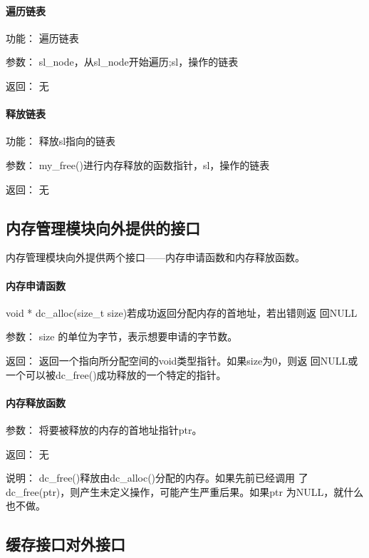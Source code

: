 \paragraph{遍历链表}
	\begin{compactdesc}
	\item[功能：]遍历链表
	\item[参数：]sl\_node，从sl\_node开始遍历;sl，操作的链表
	\item[返回：]无
	\end{compactdesc}
\paragraph{ 释放链表}
	\begin{compactdesc}
	\item[功能：]释放sl指向的链表
	\item[参数：]my\_free()进行内存释放的函数指针，sl，操作的链表
	\item[返回：]无
	\end{compactdesc}


\subsection{内存管理模块向外提供的接口}
内存管理模块向外提供两个接口——内存申请函数和内存释放函数。
\paragraph{内存申请函数}
	{void * dc\_alloc(size\_t size)}{若成功返回分配内存的首地址，若出错则返
	回NULL}
	\begin{compactdesc}
	\item[参数：]size 的单位为字节，表示想要申请的字节数。
	\item[返回：]返回一个指向所分配空间的void类型指针。如果size为0，则返
	回NULL或一个可以被dc\_free()成功释放的一个特定的指针。
	\end{compactdesc}
\paragraph{内存释放函数}
	\begin{compactdesc}
	\item[参数：]将要被释放的内存的首地址指针ptr。
	\item[返回：]无
	\item[说明：]dc\_free()释放由dc\_alloc()分配的内存。如果先前已经调用
		了dc\_free(ptr)，则产生未定义操作，可能产生严重后果。如果ptr
		为NULL，就什么也不做。 
	\end{compactdesc}

\subsection{缓存接口对外接口}

%
